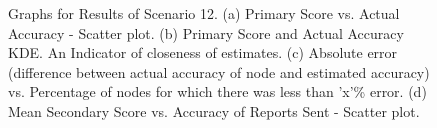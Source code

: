 \documentclass[journal]{IEEEtran}
\begin{document}
\begin{figure}[!ht]
{	}
\end{figure}
\begin{figure}[!ht]
	\caption{Graphs for Results of Scenario 12. (a) Primary Score vs. Actual Accuracy - Scatter plot. (b) Primary Score and Actual Accuracy KDE. An Indicator of closeness of estimates. (c) Absolute error (difference between actual accuracy of node and estimated accuracy) vs. Percentage of nodes for which there was less than 'x'\% error. (d) Mean Secondary Score vs. Accuracy of Reports Sent - Scatter plot.}
	\label{fig:apdx:sc12}
	\centering
\end{figure}
\end{document}
